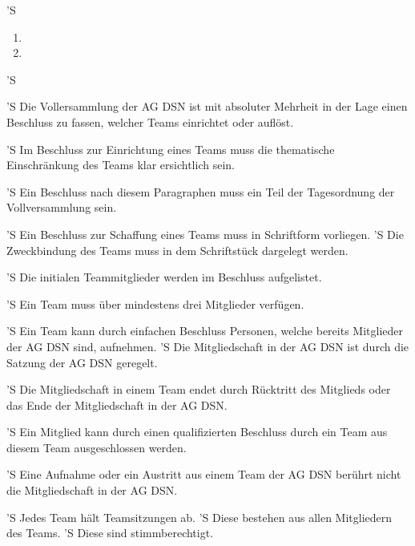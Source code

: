 \documentclass[draft,parskip=half-,DIV=12,mpinclude]{scrartcl}
\begin{document}
\begin{contract}
'S 
\begin{enumerate}
  \item {}
  \item {}
\end{enumerate}

'S 


'S Die Vollersammlung der AG DSN ist mit absoluter Mehrheit in der Lage einen Beschluss zu fassen, welcher Teams einrichtet oder auflöst.

'S Im Beschluss zur Einrichtung eines Teams muss die thematische Einschränkung des Teams klar ersichtlich sein.

'S Ein Beschluss nach diesem Paragraphen muss ein Teil der Tagesordnung der Vollversammlung sein.

'S Ein Beschluss zur Schaffung eines Teams muss in Schriftform vorliegen.
'S Die Zweckbindung des Teams muss in dem Schriftstück dargelegt werden.

'S Die initialen Teammitglieder werden im Beschluss aufgelistet.

'S Ein Team muss über mindestens drei Mitglieder verfügen.


'S Ein Team kann durch einfachen Beschluss Personen, welche bereits Mitglieder der AG DSN sind, aufnehmen.
'S Die Mitgliedschaft in der AG DSN ist durch die Satzung der AG DSN geregelt.

'S Die Mitgliedschaft in einem Team endet durch Rücktritt des Mitglieds oder das Ende der Mitgliedschaft in der AG DSN.

'S Ein Mitglied kann durch einen qualifizierten Beschluss durch ein Team aus diesem Team ausgeschlossen werden.

'S Eine Aufnahme oder ein Austritt aus einem Team der AG DSN berührt nicht die Mitgliedschaft in der AG DSN.


'S Jedes Team hält Teamsitzungen ab.
'S Diese bestehen aus allen Mitgliedern des Teams.
'S Diese sind stimmberechtigt.


\end{contract}
\end{document}
